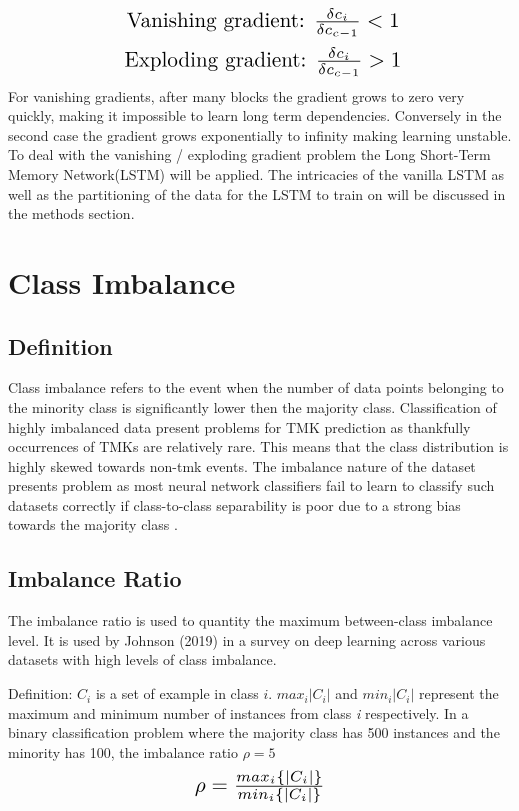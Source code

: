 \[ \scalebox{1.5}{ Vanishing gradient: $\frac{\delta{c_i}}{\delta {c_{c-1}}}  < 1 $} \] 
\[ \scalebox{1.5}{ Exploding gradient: $\frac{\delta{c_i}}{\delta {c_{c-1}}}  > 1 $} \] 
For vanishing gradients, after many blocks the gradient grows to zero very quickly, making it impossible to learn long term dependencies. Conversely in the second case the gradient grows exponentially to infinity making learning unstable. To deal with the vanishing / exploding gradient problem the Long Short-Term Memory Network(LSTM) will be applied. The intricacies of the vanilla LSTM as well as the partitioning of the data for the LSTM to train on will be discussed in the methods section.


\section{Class Imbalance}
\subsection{Definition}
Class imbalance refers to the event when the number of data points belonging to the minority class is significantly lower then the majority class. Classification of highly imbalanced data present problems for TMK prediction as thankfully occurrences of TMKs are relatively rare. This means that the class distribution is highly skewed towards non-tmk events. The imbalance nature of the dataset presents problem as most neural network classifiers fail to learn to classify such datasets correctly if class-to-class separability is poor due to a strong bias towards the majority class \cite{vidwath}.

\subsection{Imbalance Ratio}
The imbalance ratio is used to quantity the maximum between-class imbalance level. It is used by Johnson (2019) \cite{Johnson} in a survey on deep learning across various datasets with high levels of class imbalance. 

Definition: $C_i$ is a set of example in class $i$. $max_i{|C_i|}$ and $min_i{|C_i|}$ represent the maximum and minimum number of instances from class \emph{i} respectively. In a binary classification problem where the majority class has 500 instances and the minority has 100, the imbalance ratio $\rho = 5$\\

\[ \scalebox{1.5}{ $\rho = \frac{max_i\{|C_i|\}}{min_i\{|C_i|\}}$ } \] 

